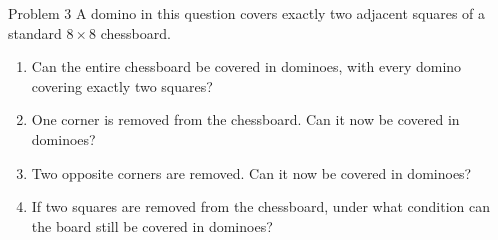 \documentclass{article}
\begin{document}
\begin{problem}{Problem 3}
A domino in this question covers exactly two adjacent squares of a standard
$8 \times 8$ chessboard.

\begin{enumerate}[label=(\alph*)]
  \item Can the entire chessboard be covered in dominoes, with every domino
  covering exactly two squares?
  \item One corner is removed from the chessboard. Can it now be covered in
  dominoes?
  \item Two opposite corners are removed. Can it now be covered in dominoes?
  \item If two squares are removed from the chessboard, under what
  condition can the board still be covered in dominoes?
\end{enumerate}
\end{problem}
\end{document}
